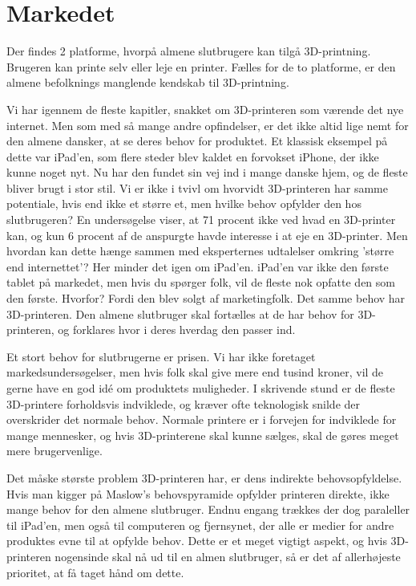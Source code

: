 \newpage
\section{Markedet} %

Der findes 2 platforme, hvorpå almene slutbrugere kan tilgå 3D-printning. Brugeren kan printe selv eller leje en printer. Fælles for de to platforme, er den almene befolknings manglende kendskab til 3D-printning.





Vi har igennem de fleste kapitler, snakket om 3D-printeren som værende det nye internet. Men som med så mange andre opfindelser, er det ikke altid lige nemt for den almene dansker, at se deres behov for produktet. Et klassisk eksempel på dette var iPad'en, som flere steder blev kaldet en forvokset iPhone, der ikke kunne noget nyt. Nu har den fundet sin vej ind i mange danske hjem, og de fleste bliver brugt i stor stil. 
Vi er ikke i tvivl om hvorvidt 3D-printeren har samme potentiale, hvis end ikke et større et, men hvilke behov opfylder den hos slutbrugeren? En undersøgelse viser, at 71 procent ikke ved hvad en 3D-printer kan, og kun 6 procent af de anspurgte havde interesse i at eje en 3D-printer. \autocite{shane_taylor_key_2013}
Men hvordan kan dette hænge sammen med eksperternes udtalelser omkring 'større end internettet'? \autocite{financial_times_3d_2012} Her minder det igen om iPad'en. iPad'en var ikke den første tablet på markedet, men hvis du spørger folk, vil de fleste nok opfatte den som den første. Hvorfor? Fordi den blev solgt af marketingfolk. Det samme behov har 3D-printeren. Den almene slutbruger skal fortælles at de har behov for 3D-printeren, og forklares hvor i deres hverdag den passer ind.

Et stort behov for slutbrugerne er prisen. Vi har ikke foretaget markedsundersøgelser, men hvis folk skal give mere end tusind kroner, vil de gerne have en god idé om produktets muligheder. I skrivende stund er de fleste 3D-printere forholdsvis indviklede, og kræver ofte teknologisk snilde der overskrider det normale behov. Normale printere er i forvejen for indviklede for mange mennesker, og hvis 3D-printerene skal kunne sælges, skal de gøres meget mere brugervenlige.

Det måske største problem 3D-printeren har, er dens indirekte behovsopfyldelse. Hvis man kigger på Maslow's behovspyramide \autocite{abraham_harold_maslow_theory_1943} opfylder printeren direkte, ikke mange behov for den almene slutbruger. Endnu engang trækkes der dog paraleller til iPad'en, men også til computeren og fjernsynet, der alle er medier for andre produktes evne til at opfylde behov. Dette er et meget vigtigt aspekt, og hvis 3D-printeren nogensinde skal nå ud til en almen slutbruger, så er det af allerhøjeste prioritet, at få taget hånd om dette.




